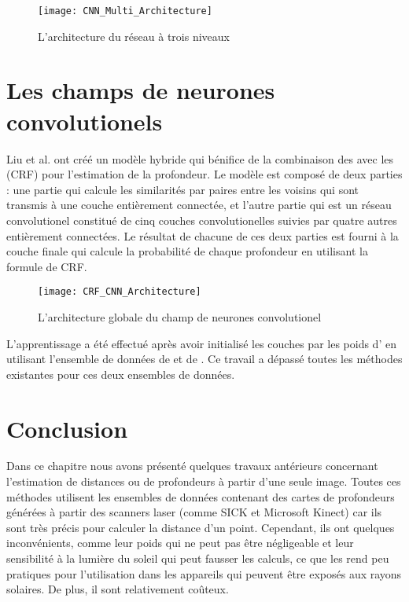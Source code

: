 \vspace{1em}

\begin{figure}[H]
\begin{center}
\texttt{[image: CNN\_Multi\_Architecture]}
\caption{L'architecture du réseau à trois niveaux}{}
\end{center}
\end{figure}

\section{Les champs de neurones convolutionels}

Liu et al.\cite{liu2015deep} ont créé un modèle hybride qui bénifice de la combinaison
des  avec les  (CRF) pour l'estimation de la profondeur. Le modèle est composé de deux
parties : une partie qui calcule les similarités par paires entre les
 voisins qui sont transmis à une couche entièrement connectée,
et l'autre partie qui est un réseau convolutionel constitué de cinq couches
convolutionelles suivies par quatre autres entièrement connectées. Le résultat
de chacune de ces deux parties est fourni à la couche finale qui calcule la
probabilité de chaque profondeur en utilisant la formule de CRF.

\begin{figure}[H]
\texttt{[image: CRF\_CNN\_Architecture]}
\caption{L'architecture globale du champ de neurones convolutionel}{}
\end{figure}

L'apprentissage a été effectué après avoir initialisé les couches par les poids
d' en utilisant l'ensemble de données de  et de
. Ce travail a dépassé toutes les méthodes existantes pour
ces deux ensembles de données.

\section{Conclusion}

Dans ce chapitre nous avons présenté quelques travaux antérieurs concernant
l'estimation de distances ou de profondeurs à partir d'une seule image.
Toutes ces méthodes utilisent les ensembles de données contenant des cartes de
profondeurs générées à partir des scanners laser (comme SICK et Microsoft Kinect)
car ils sont très précis pour calculer la distance d'un point.
Cependant, ils ont quelques inconvénients, comme leur poids qui ne peut pas être négligeable
et leur sensibilité à la lumière du soleil qui peut fausser les calculs, ce que
les rend peu pratiques pour l'utilisation dans les appareils qui peuvent être
exposés aux rayons solaires. De plus, il sont relativement coûteux.

